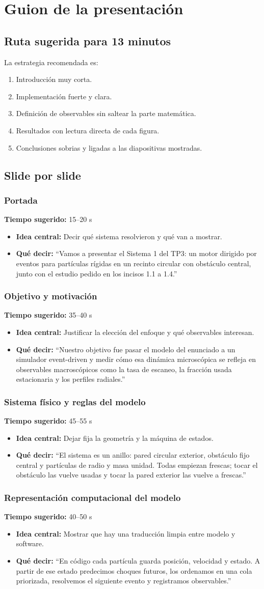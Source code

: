 \documentclass[11pt]{article}
\newcommand{\slideguide}[4]{
  \subsubsection*{#1}
  \textbf{Tiempo sugerido:} #2
  \begin{itemize}
    \item \textbf{Idea central:} #3
    \item \textbf{Qu\'e decir:} #4
  \end{itemize}
}
\begin{document}
\section{Guion de la presentaci\'on}
\label{sec:guion}

\subsection{Ruta sugerida para 13 minutos}

La estrategia recomendada es:

\begin{enumerate}
  \item Introducci\'on muy corta.
  \item Implementaci\'on fuerte y clara.
  \item Definici\'on de observables sin saltear la parte matem\'atica.
  \item Resultados con lectura directa de cada figura.
  \item Conclusiones sobrias y ligadas a las diapositivas mostradas.
\end{enumerate}

\subsection{Slide por slide}

\slideguide{Portada}{15--20 s}{Decir qu\'e sistema resolvieron y qu\'e van a mostrar.}{``Vamos a presentar el Sistema 1 del TP3: un motor dirigido por eventos para part\'iculas r\'igidas en un recinto circular con obst\'aculo central, junto con el estudio pedido en los incisos 1.1 a 1.4.''}

\slideguide{Objetivo y motivaci\'on}{35--40 s}{Justificar la elecci\'on del enfoque y qu\'e observables interesan.}{``Nuestro objetivo fue pasar el modelo del enunciado a un simulador event-driven y medir c\'omo esa din\'amica microsc\'opica se refleja en observables macrosc\'opicos como la tasa de escaneo, la fracci\'on usada estacionaria y los perfiles radiales.''}

\slideguide{Sistema f\'isico y reglas del modelo}{45--55 s}{Dejar fija la geometr\'ia y la m\'aquina de estados.}{``El sistema es un anillo: pared circular exterior, obst\'aculo fijo central y part\'iculas de radio y masa unidad. Todas empiezan frescas; tocar el obst\'aculo las vuelve usadas y tocar la pared exterior las vuelve a frescas.''}

\slideguide{Representaci\'on computacional del modelo}{40--50 s}{Mostrar que hay una traducci\'on limpia entre modelo y software.}{``En c\'odigo cada part\'icula guarda posici\'on, velocidad y estado. A partir de ese estado predecimos choques futuros, los ordenamos en una cola priorizada, resolvemos el siguiente evento y registramos observables.''}
\end{document}
